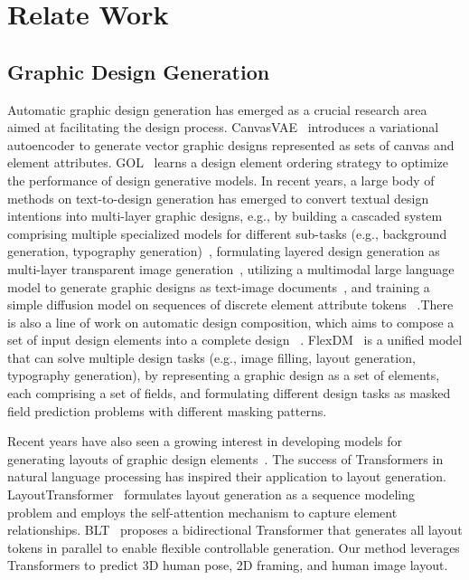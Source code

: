 \section{Relate Work}
\label{sec:Relatework}

\subsection{Graphic Design Generation}

Automatic graphic design generation has emerged as a crucial research area aimed at facilitating the design process.
CanvasVAE~\cite{yamaguchi2021canvasvae}  introduces a variational autoencoder to generate vector graphic designs represented as sets of canvas and element attributes. GOL~\cite{order} 
learns a design element ordering strategy to optimize the performance of design generative models. In recent years, a large body of methods on text-to-design generation has emerged to convert textual design intentions into multi-layer graphic designs, e.g., by building a cascaded system comprising multiple specialized models for different sub-tasks (e.g., background generation, typography generation)~\cite{cole,opencole},
formulating layered design generation as multi-layer transparent image generation~\cite{art}, 
utilizing a multimodal large language model to generate graphic designs as text-image documents~\cite{igd}, 
and training a simple diffusion model on sequences of discrete element attribute tokens ~\cite{LADEREIN}.There is also a line of work on automatic design composition, which aims to compose a set of input design elements into a complete design ~\cite{shabani2024visual,Graphist,LaDeCo}. 
FlexDM~\cite{flexdm} is a unified model that can solve multiple design tasks (e.g., image filling, layout generation, typography generation), by representing a graphic design as a set of elements, each comprising a set of fields, and formulating different design tasks as masked field prediction problems with different masking patterns.

Recent years have also seen a growing interest in developing models for generating layouts of graphic design elements~\cite{LayoutPrompter,jyothi2019layoutvae,Content-aware-Generative,VTN,PosterLlama,LayoutDiffusion,LayoutGAN,yang2026learninginteractionimagelayout}.
The success of Transformers in natural language processing has inspired their application to layout generation. LayoutTransformer~\cite{gupta2021layouttransformer} formulates layout generation as a sequence modeling problem and employs the self-attention mechanism to capture element relationships. BLT~\cite{kong2022blt} proposes a bidirectional Transformer that generates all layout tokens in parallel to enable flexible controllable generation.
Our method leverages Transformers to predict 3D human pose, 2D framing, and human image layout.

